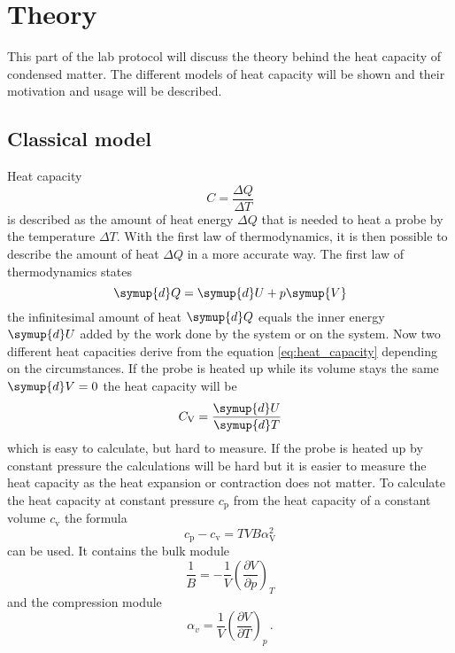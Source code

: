 \section{Theory}
\label{sec:theorie}
This part of the lab protocol will discuss the theory behind the heat capacity of condensed matter.
The different models of heat capacity will be shown and their motivation and usage will be described.
\subsection{Classical model}
Heat capacity 
\begin{equation}
    C = \frac{\Delta Q}{\Delta T}
    \label{eq:heat_capacity}
\end{equation}
is described as the amount of heat energy $\Delta Q$ that is needed to heat a probe by the temperature $\Delta T$.
With the first law of thermodynamics, it is then possible to describe the amount of heat $\Delta Q$ in a more accurate way.
The first law of thermodynamics states 
\begin{equation*}
    \symup{d}Q = \symup{d}U + p\symup{V}
\end{equation*}
the infinitesimal amount of heat $\symup{d}Q$ equals the inner energy $\symup{d}U$ added by the work done by the system or on the system.
Now two different heat capacities derive from the equation \eqref{eq:heat_capacity} depending on the circumstances.
If the probe is heated up while its volume stays the same $\symup{d}V=0$ the heat capacity will be 
\begin{equation}
    C_\text{V} = \frac{\symup{d}U}{\symup{d}T}
    \label{eq:heat_cap_v}
\end{equation}
which is easy to calculate, but hard to measure.
If the probe is heated up by constant pressure the calculations will be hard but it is easier to measure the heat capacity as the heat expansion or contraction does not matter.
To calculate the heat capacity at constant pressure $c_\text{p}$ from the heat capacity of a constant volume $c_\text{v}$ the formula
\begin{equation}
    c_\text{p} - c_\text{v} = TVB\alpha_\text{V}^2
    \label{eq:correction_formula}
\end{equation}
can be used.
It contains the bulk module 
\begin{equation*}
\frac{1}{B} = - \frac{1}{V} \left (\frac{\partial  V}{\partial p} \right )_T
\end{equation*}
and the compression module
\begin{equation*}
    \alpha_v = \frac{1}{V} \left( \frac{\partial V}{\partial T}\right )_p\, .
\end{equation*}
